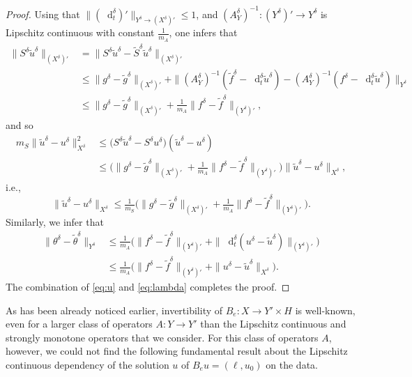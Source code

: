 \documentclass{amsart}
\numberwithin{equation}{section}
\newcommand{\1}{\mathbb 1}
\newcommand*\diff{\mathop{}\!\mathrm{d}}
\newcommand{\be}{\begin{equation}}
\newcommand{\ee}{\end{equation}}
\begin{document}
\begin{proof}
Using that $\|(\diff^\delta_t)'\|_{Y^\delta \rightarrow (X^\delta)'} \leq 1$, and $(A_Y^\delta)^{-1}\colon (Y^\delta)' \rightarrow Y^\delta$ is Lipschitz continuous with constant $\frac{1}{m_A}$, one  infers that
\begin{align*}
\|S^\delta \widetilde{u}^\delta\|_{(X^\delta)'}&=\|S^\delta \widetilde{u}^\delta-\widetilde{S}^\delta \widetilde{u}^\delta\|_{(X^\delta)'}\\ & \leq
\|g^\delta-\widetilde{g}^\delta\|_{(X^\delta)'}+\|(A_Y^\delta)^{-1}(\widetilde{f}^\delta-\diff_t^\delta \widetilde{u}^\delta)-(A_Y^\delta)^{-1}(f^\delta-\diff_t^\delta \widetilde{u}^\delta)\|_{Y^\delta}
\\ & \leq \|g^\delta-\widetilde{g}^\delta\|_{(X^\delta)'}+\tfrac{1}{m_A} \|f^\delta-\widetilde{f}^\delta\|_{(Y^\delta)'},
\end{align*}
and so
\begin{align*}
m_{S} \|\widetilde{u}^\delta-u^\delta\|_{X^\delta}^2 &\leq \big(S^\delta \widetilde{u}^\delta-S^\delta u^\delta \big)(\widetilde{u}^\delta-u^\delta) \\
&\leq
\big(\|g^\delta-\widetilde{g}^\delta\|_{(X^\delta)'}+\tfrac{1}{m_A}\|f^\delta-\widetilde{f}^\delta\|_{(Y^\delta)'}\big)\|\widetilde{u}^\delta-u^\delta\|_{X^\delta},
\end{align*}
i.e.,
\be \label{eq:u}
\|\widetilde{u}^\delta-u^\delta\|_{X^\delta} \leq \tfrac{1}{m_{S}}\big(\|g^\delta-\widetilde{g}^\delta\|_{(X^\delta)'}+\tfrac{1}{m_A}\|f^\delta-\widetilde{f}^\delta\|_{(Y^\delta)'}\big).
\ee
Similarly, we infer that
\begin{align} \nonumber
\|\theta^\delta-\widetilde{\theta}^\delta\|_{Y^\delta} &\leq \tfrac{1}{m_A} \big(\|f^\delta-\widetilde{f}^\delta\|_{(Y^\delta)'}+\|\diff_t^\delta (u^\delta-\widetilde{u}^\delta)\|_{(Y^\delta)'}\big)\\ \label{eq:lambda}
&\leq \tfrac{1}{m_A} \big(\|f^\delta-\widetilde{f}^\delta\|_{(Y^\delta)'}+\|u^\delta-\widetilde{u}^\delta\|_{X^\delta}).
\end{align}
The combination of \eqref{eq:u} and \eqref{eq:lambda} completes the proof.
\end{proof}

As has been already noticed earlier, invertibility of $B_e\colon X \rightarrow Y' \times H$ is well-known, even for a larger class of operators $A\colon Y \rightarrow Y'$ than the Lipschitz continuous and strongly monotone operators that we consider. For this class of operators $A$, however, we could not find the following fundamental result about the Lipschitz continuous dependency of the solution $u$ of $B_e u= (\ell, u_0)$ on the data.
\end{document}
